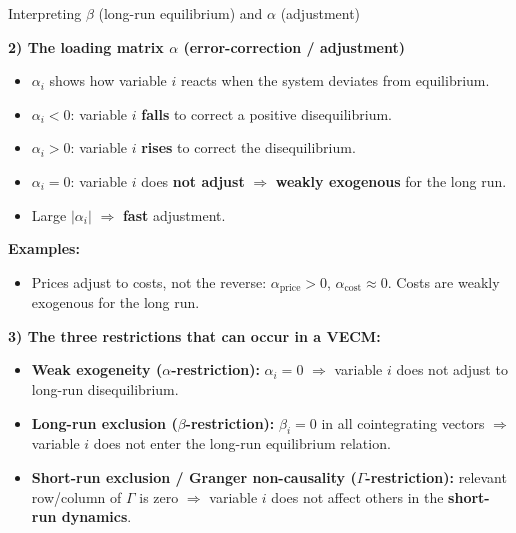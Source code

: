 \documentclass{beamer}
\begin{document}
\begin{frame}{Interpreting $\beta$ (long-run equilibrium) and $\alpha$ (adjustment)}
\footnotesize


\textbf{2) The loading matrix $\alpha$ (error-correction / adjustment)}
\begin{itemize}
  \item $\alpha_i$ shows how variable $i$ reacts when the system deviates from equilibrium.
  \item $\alpha_i < 0$: variable $i$ \textbf{falls} to correct a positive disequilibrium.  
  \item $\alpha_i > 0$: variable $i$ \textbf{rises} to correct the disequilibrium.
  \item $\alpha_i = 0$: variable $i$ does \textbf{not adjust} $\Longrightarrow$ \textbf{weakly exogenous} for the long run.
  \item Large $|\alpha_i|$ $\Rightarrow$ \textbf{fast} adjustment.
\end{itemize}
\textbf{Examples:}
\begin{itemize}
  \item Prices adjust to costs, not the reverse: $\alpha_{\text{price}} > 0$, $\alpha_{\text{cost}} \approx 0$. Costs are weakly exogenous for the long run. 
\end{itemize}

\medskip
\textbf{3) The three restrictions that can occur in a VECM:}
\begin{itemize}
  \item \textbf{Weak exogeneity ($\alpha$-restriction):} $\alpha_i = 0$ $\Rightarrow$ variable $i$ does not adjust to long-run disequilibrium.
  \item \textbf{Long-run exclusion ($\beta$-restriction):} $\beta_i = 0$ in all cointegrating vectors $\Rightarrow$ variable $i$ does not enter the long-run equilibrium relation.
  \item \textbf{Short-run exclusion / Granger non-causality ($\Gamma$-restriction):} relevant row/column of $\Gamma$ is zero $\Rightarrow$ variable $i$ does not affect others in the \textbf{short-run dynamics}.
\end{itemize}
\end{frame}
\end{document}
